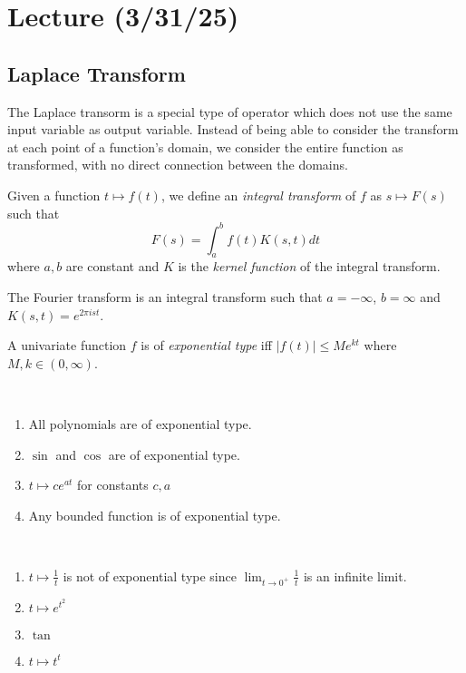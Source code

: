 \documentclass[notes]{subfiles}
\begin{document}
\setcounter{section}{15}
\section{Lecture (3/31/25)}

\subsection{Laplace Transform}
The Laplace transorm is a special type of operator which does not use the same input variable as output variable. Instead of being able to consider the transform at each point of a function's domain, we consider the entire function as transformed, with no direct connection between the domains.

\begin{definition}
    Given a function $t \mapsto f(t)$, we define an \textit{integral transform} of $f$ as $s \mapsto F(s)$ such that
    \[
        F(s) = \int_a^b f(t)K(s, t)dt
    \]
    where $a, b$ are constant and $K$ is the \textit{kernel function} of the integral transform.
\end{definition}

\begin{example}
    The Fourier transform is an integral transform such that $a = -\infty$, $b = \infty$ and $K(s, t) = e^{2\pi i st}$.
\end{example}

\begin{definition}
    A univariate function $f$ is of \textit{exponential type} iff $|f(t)| \leq Me^{kt}$ where $M, k \in (0, \infty)$.
\end{definition}

\begin{example}
    ~\par
    \begin{enumerate}[label = (\arabic*)]
        \item All polynomials are of exponential type.
        \item $\sin$ and $\cos$ are of exponential type.
        \item $t \mapsto ce^{at}$ for constants $c, a$
        \item Any bounded function is of exponential type.
    \end{enumerate}
\end{example}

\begin{example}
    ~\par
    \begin{enumerate}[label = (\arabic*)]
        \item $t \mapsto \frac{1}{t}$ is not of exponential type since $\lim_{t \to 0^+} \frac{1}{t}$ is an infinite limit.
        \item $t \mapsto e^{t^2}$
        \item $\tan$
        \item $t \mapsto t^t$
    \end{enumerate}
\end{example}
\end{document}
